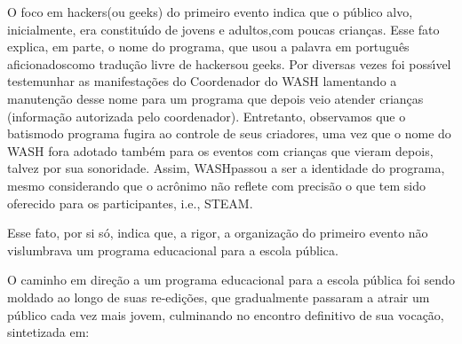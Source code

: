 \documentclass[
12pt,		%
openright,	%
twoside,  %
a4paper,			%
chapter=TITLE,		%
english,			%
french,				%
spanish,			%
brazil				%
]{USPSC-classe/USPSC}
\begin{document}
O foco em \textquotedbl hackers\textquotedbl  (ou \textquotedbl geeks\textquotedbl ) do primeiro evento indica que o p\'ublico alvo, inicialmente, era constitu\'{\i}do de jovens e adultos,com  poucas crian\c{c}as. Esse fato explica, em parte, o nome do programa, que usou a palavra em portugu\^es \textquotedbl aficionados\textquotedbl  como tradu\c{c}\~ao livre de \textquotedbl hackers\textquotedbl  ou \textquotedbl geeks\textquotedbl . Por diversas vezes foi poss\'{\i}vel testemunhar as manifesta\c{c}\~oes do Coordenador do WASH lamentando a manuten\c{c}\~ao desse nome para um programa que depois veio atender crian\c{c}as (informa\c{c}\~ao autorizada pelo coordenador). Entretanto, observamos que o \textquotedbl batismo\textquotedbl  do programa fugira ao controle de seus criadores, uma vez que o nome do WASH fora adotado tamb\'em para os eventos com crian\c{c}as que vieram depois, talvez por sua sonoridade. Assim, \textquotedbl WASH\textquotedbl  passou a ser a identidade do programa, mesmo considerando que o acr\^onimo n\~ao reflete com precis\~ao o que tem sido oferecido para os participantes, i.e., STEAM.










Esse fato, por si s\'o, indica que, a rigor, a organiza\c{c}\~ao do primeiro evento n\~ao vislumbrava um programa educacional para a escola p\'ublica.










O caminho em dire\c{c}\~ao a um programa educacional para a escola p\'ublica foi sendo moldado ao longo de suas re-edi\c{c}\~oes, que gradualmente passaram a atrair um p\'ublico cada vez mais jovem, culminando no encontro definitivo de sua voca\c{c}\~ao, sintetizada em:











\noindent\begin{center}\mbox{\centering{}}\end{center}
\end{document}
